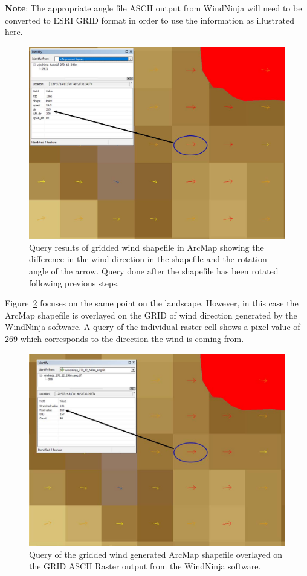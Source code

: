 \documentclass[12pt]{article}
\begin{document}
\textbf{Note}: The appropriate angle file ASCII output from WindNinja will need to be converted to ESRI
GRID format in order to use the information as illustrated here.

\begin{figure}[H]
	\centering
	\includegraphics[scale=0.35]{arc_11.png}
	\caption{Query results of gridded wind shapefile in ArcMap showing the difference in the wind direction in the shapefile and
the rotation angle of the arrow. Query done after the shapefile has been rotated following previous steps.}
\label{fig:Figure11}
\end{figure}
\newpage
Figure~\ref{fig:Figure12} focuses on the same point on the landscape. However, in this case the ArcMap shapefile is
overlayed on the GRID of wind direction generated by the WindNinja software. A query of the individual
raster cell shows a pixel value of 269 which corresponds to the direction the wind is coming from.

\begin{figure}[H]
	\centering
	\includegraphics[scale=0.5]{arc_12.png}
	\caption{Query of the gridded wind generated ArcMap shapefile overlayed on the GRID ASCII Raster output from the WindNinja software.}
\label{fig:Figure12}
\end{figure}
\end{document}
